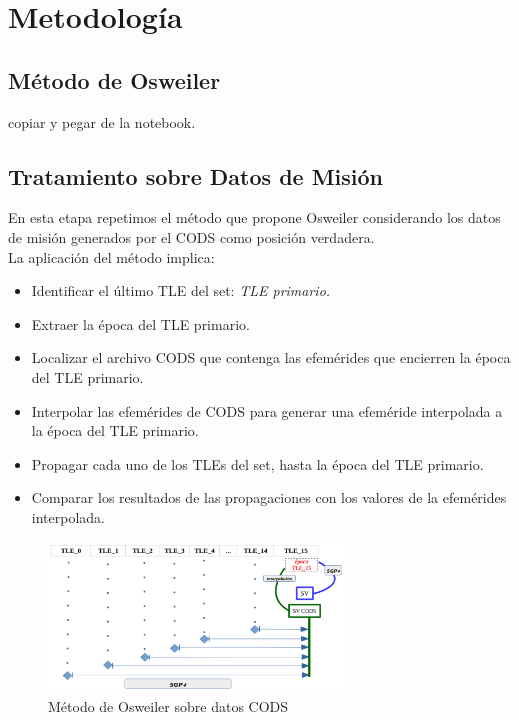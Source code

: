 \chapter{Metodología}
\label{chap:metodologia}


\section{M\'etodo de Osweiler}
copiar y pegar de la notebook.

\section{Tratamiento sobre Datos de Misi\'on}
En esta etapa repetimos el m\'etodo que propone Osweiler considerando los datos de misi\'on generados por el CODS
como posici\'on verdadera.\\
La aplicaci\'on del m\'etodo implica:
\begin{itemize}
 \item Identificar el \'ultimo TLE del set: {\it{TLE primario.}}
 \item Extraer la \'epoca del TLE primario.
 \item Localizar el archivo CODS que contenga las efem\'erides que encierren la \'epoca del TLE primario.
 \item Interpolar las efem\'erides de CODS para generar una efem\'eride interpolada a la \'epoca del TLE primario.
 \item Propagar cada uno de los TLEs del set, hasta la \'epoca del TLE primario.
 \item Comparar los resultados de las propagaciones con los valores de la efem\'erides interpolada.
\end{itemize}

\begin{figure}[!h]
 \centering
 \includegraphics[width=0.7\textwidth]{imagenes/Osweiler_sobre_Cods.png}
 \caption{M\'etodo de Osweiler sobre datos CODS}
\end{figure}

